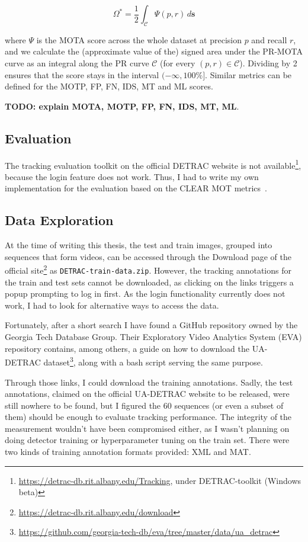 \[ \Omega^{*} = \frac{1}{2}\int_{\mathcal{C}} \Psi(p, r) \,d\textbf{s} \]

where $\Psi$ is the MOTA score across the whole dataset at precision $p$ and recall $r$, and we calculate the (approximate value of the) signed area under the PR-MOTA curve as an integral along the PR curve $\mathcal{C}$ (for every $(p, r) \in \mathcal{C}$). Dividing by 2 ensures that the score stays in the interval $(-\infty, 100\%]$. Similar metrics can be defined for the MOTP, FP, FN, IDS, MT and ML scores.

\textbf{TODO: explain MOTA, MOTP, FP, FN, IDS, MT, ML}.

\subsection{Evaluation}

The tracking evaluation toolkit on the official DETRAC website is not available\footnote{\url{https://detrac-db.rit.albany.edu/Tracking}, under DETRAC-toolkit (Windows beta)}, because the login feature does not work. Thus, I had to write my own implementation for the evaluation based on the CLEAR MOT metrics~\cite{Bernardin2008}.

\subsection{Data Exploration}

At the time of writing this thesis, the test and train images, grouped into sequences that form videos, can be accessed through the Download page of the official site\footnote{\url{https://detrac-db.rit.albany.edu/download}} as \verb|DETRAC-train-data.zip|. However, the tracking annotations for the train and test sets cannot be downloaded, as clicking on the links triggers a popup prompting to log in first. As the login functionality currently does not work, I had to look for alternative ways to access the data.  

Fortunately, after a short search I have found a GitHub repository owned by the Georgia Tech Database Group. Their Exploratory Video Analytics System (EVA) repository contains, among others, a guide on how to download the UA-DETRAC dataset\footnote{\url{https://github.com/georgia-tech-db/eva/tree/master/data/ua_detrac}}, along with a bash script serving the same purpose.

Through those links, I could download the training annotations. Sadly, the test annotations, claimed on the official UA-DETRAC website to be released, were still nowhere to be found, but I figured the 60 sequences (or even a subset of them) should be enough to evaluate tracking performance. The integrity of the measurement wouldn't have been compromised either, as I wasn't planning on doing detector training or hyperparameter tuning on the train set. There were two kinds of training annotation formats provided: XML and MAT.

